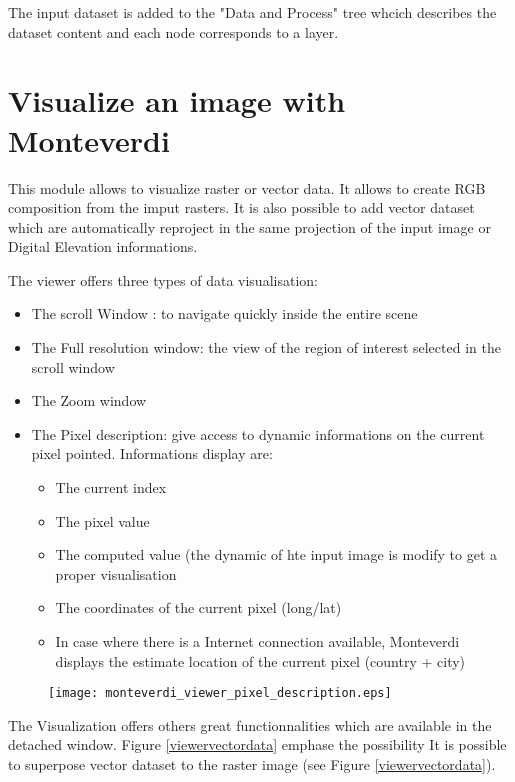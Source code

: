 \documentclass{InsightSoftwareGuide}
\begin{document}
The input dataset is added to the "Data and Process" tree whcich describes the dataset content and each node corresponds to a layer.

\section{Visualize an image with Monteverdi}
This module allows to visualize raster or vector data. It allows to create RGB composition from the imput rasters. It is also possible to add 
vector dataset which are automatically reproject in the same projection of the input image or Digital Elevation informations. 

The viewer offers three types of data visualisation: 

\begin{itemize}
\item The scroll Window : to navigate quickly inside the entire scene
\item The Full resolution window: the view of the region of interest selected in the scroll window 
\item The Zoom window
\item The Pixel description: give access to dynamic informations on the current pixel pointed. Informations display are:
  \begin{itemize}
  \item The current index
  \item The pixel value 
  \item The computed value (the dynamic of hte input image is modify to get a proper visualisation
  \item The coordinates of the current pixel (long/lat)
  \item In case where there is a Internet connection available, Monteverdi displays the estimate location of the current pixel (country + city)  
  \end{itemize} 
\end{itemize}

\begin{figure}
   \center
   \texttt{[image: monteverdi\_viewer\_pixel\_description.eps]}
   \label{fig:viewerpixeldescription}
\end{figure}

The Visualization offers others great functionnalities which are available in the detached window.
Figure \ref{viewervectordata} emphase the possibility It is possible to superpose vector dataset
to the raster image (see Figure \ref{viewervectordata}).
\end{document}
